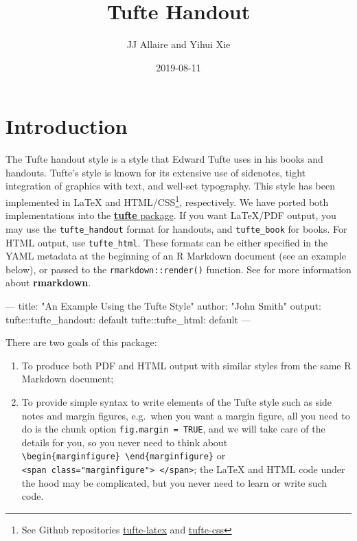 \documentclass[]{tufte-handout}
\title{Tufte Handout}
\author{JJ Allaire and Yihui Xie}
\date{2019-08-11}
\newenvironment{Shaded}{}{}
\newcommand{\StringTok}[1]{\textcolor[rgb]{0.25,0.44,0.63}{#1}}
\newcommand{\OtherTok}[1]{\textcolor[rgb]{0.00,0.44,0.13}{#1}}
\newcommand{\FunctionTok}[1]{\textcolor[rgb]{0.02,0.16,0.49}{#1}}
\newcommand{\AttributeTok}[1]{\textcolor[rgb]{0.49,0.56,0.16}{#1}}
\providecommand{\tightlist}{%
  \setlength{\itemsep}{0pt}\setlength{\parskip}{0pt}}
\begin{document}
\maketitle




\section{Introduction}\label{introduction}

The Tufte handout style is a style that Edward Tufte uses in his books
and handouts. Tufte's style is known for its extensive use of sidenotes,
tight integration of graphics with text, and well-set typography. This
style has been implemented in LaTeX and HTML/CSS\footnote{See Github
  repositories
  \href{https://github.com/tufte-latex/tufte-latex}{tufte-latex} and
  \href{https://github.com/edwardtufte/tufte-css}{tufte-css}},
respectively. We have ported both implementations into the
\href{https://github.com/rstudio/tufte}{\textbf{tufte} package}. If you
want LaTeX/PDF output, you may use the \texttt{tufte\_handout} format
for handouts, and \texttt{tufte\_book} for books. For HTML output, use
\texttt{tufte\_html}. These formats can be either specified in the YAML
metadata at the beginning of an R Markdown document (see an example
below), or passed to the \texttt{rmarkdown::render()} function. See
\citet{R-rmarkdown} for more information about \textbf{rmarkdown}.

\begin{Shaded}
\begin{Highlighting}[]
\OtherTok{---}
\FunctionTok{title:}\AttributeTok{ }\StringTok{"An Example Using the Tufte Style"}
\FunctionTok{author:}\AttributeTok{ }\StringTok{"John Smith"}
\FunctionTok{output:}
  \FunctionTok{tufte:}\AttributeTok{:tufte_handout: default}
  \FunctionTok{tufte:}\AttributeTok{:tufte_html: default}
\OtherTok{---}
\end{Highlighting}
\end{Shaded}

There are two goals of this package:

\begin{enumerate}
\def\labelenumi{\arabic{enumi}.}
\tightlist
\item
  To produce both PDF and HTML output with similar styles from the same
  R Markdown document;
\item
  To provide simple syntax to write elements of the Tufte style such as
  side notes and margin figures, e.g.~when you want a margin figure, all
  you need to do is the chunk option \texttt{fig.margin\ =\ TRUE}, and
  we will take care of the details for you, so you never need to think
  about
  \texttt{\textbackslash{}begin\{marginfigure\}\ \textbackslash{}end\{marginfigure\}}
  or
  \texttt{\textless{}span\ class="marginfigure"\textgreater{}\ \textless{}/span\textgreater{}};
  the LaTeX and HTML code under the hood may be complicated, but you
  never need to learn or write such code.
\end{enumerate}
\end{document}

